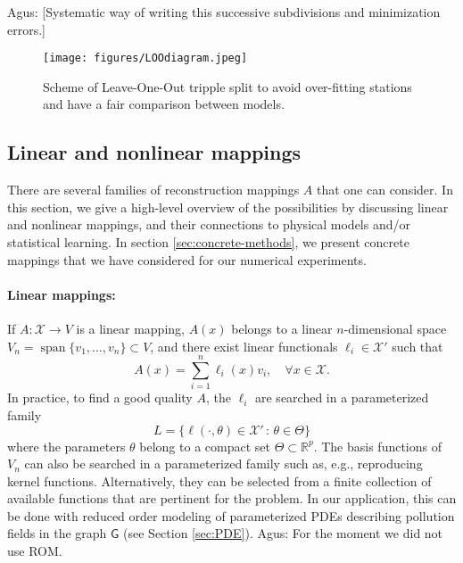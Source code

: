 \documentclass[11pt,a4paper,twoside]{article}
\newcommand{\ascomment}[1]{{\color{teal} Agus: #1}}
\theoremstyle{definition}
\numberwithin{equation}{section}
\newcommand{\cX}{\ensuremath{\mathcal{X}}}
\newcommand{\bR}{\ensuremath{\mathbb{R}}}
\newcommand{\G}{\ensuremath{\textsf{G}}} %
\newcommand{\<}{\langle}
\renewcommand{\>}{\rangle}
\newcommand{\vspan}{\operatorname{span}}
\newcommand{\cond}{\ensuremath{\,:\,}}
\begin{document}
\ascomment{[Systematic way of writing this successive subdivisions and minimization errors.]}



\begin{figure}
    \centering
    \texttt{[image: figures/LOOdiagram.jpeg]}
    \caption{Scheme of Leave-One-Out tripple split to avoid over-fitting stations and have a fair comparison between models.}
    \label{fig:loodiagram}
\end{figure}

\subsection{Linear and nonlinear mappings}
\label{sec:mappings}
There are several families of reconstruction mappings $A$ that one can consider. In this section, we give a high-level overview of the possibilities by discussing  linear and nonlinear mappings, and their connections to physical models and/or statistical learning. In section \ref{sec:concrete-methods}, we present concrete mappings that we have considered for our numerical experiments.

\paragraph{Linear mappings:} If $A: \cX\to V$ is a linear mapping, $A(x)$ belongs to a linear $n$-dimensional space $V_n = \vspan\{v_1,\dots, v_n\} \subset V$, and there exist linear functionals $\ell_i \in \cX'$ such that
$$
A(x) = \sum_{i=1}^n \ell_i(x) v_i, \quad \forall x \in \cX.
$$
In practice, to find a good quality $A$, the $\ell_i$ are searched in a parameterized family
$$
L = \{\ell(\cdot , \theta) \in \cX' \cond \theta \in \Theta\}
$$
where the parameters $\theta$ belong to a compact set $\Theta \subset \bR^p$. The basis functions of $V_n$ can also be searched in a parameterized family such as, e.g., reproducing kernel functions. Alternatively, they can be selected from a finite collection of available functions that are pertinent for the problem. In our application, this can be done with reduced order modeling of parameterized PDEs describing pollution fields in the graph $\G$ (see Section \ref{sec:PDE}). \ascomment{For the moment we did not use ROM.}
\end{document}
